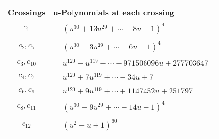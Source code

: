 \documentclass[1p]{elsarticle_modified}
\theoremstyle{definition}
\begin{document}
\begin{tabular}{m{50pt}|m{274pt}}
Crossings & \hspace{64pt}u-Polynomials at each crossing \\
\hline $$\begin{aligned}c_{1}\end{aligned}$$&$\begin{aligned}
&(u^{30}+13 u^{29}+\cdots+8 u+1)^{4}
\end{aligned}$\\
\hline $$\begin{aligned}c_{2},c_{5}\end{aligned}$$&$\begin{aligned}
&(u^{30}-3 u^{29}+\cdots+6 u-1)^{4}
\end{aligned}$\\
\hline $$\begin{aligned}c_{3},c_{10}\end{aligned}$$&$\begin{aligned}
&u^{120}- u^{119}+\cdots-971506096 u+277703647
\end{aligned}$\\
\hline $$\begin{aligned}c_{4},c_{7}\end{aligned}$$&$\begin{aligned}
&u^{120}+7 u^{119}+\cdots-34 u+7
\end{aligned}$\\
\hline $$\begin{aligned}c_{6},c_{9}\end{aligned}$$&$\begin{aligned}
&u^{120}+9 u^{119}+\cdots+1147452 u+251797
\end{aligned}$\\
\hline $$\begin{aligned}c_{8},c_{11}\end{aligned}$$&$\begin{aligned}
&(u^{30}-9 u^{29}+\cdots-14 u+1)^{4}
\end{aligned}$\\
\hline $$\begin{aligned}c_{12}\end{aligned}$$&$\begin{aligned}
&(u^2- u+1)^{60}
\end{aligned}$\\
\hline
\end{tabular}\\~\\
\newpage\renewcommand{\arraystretch}{1}
\end{document}
